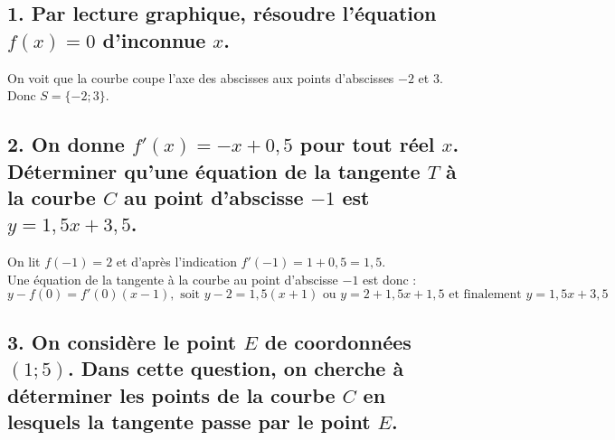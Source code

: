 	
	
	\subsection*{1. Par lecture graphique, résoudre l'équation $f(x) = 0$ d'inconnue $x$.}
	
On voit que la courbe coupe l'axe des abscisses aux points d'abscisses $-2$ et $3$. \\
	Donc $S = \{-2; 3\}$.
	
	\subsection*{2. On donne $f'(x) = -x + 0,5$ pour tout réel $x$. Déterminer qu'une équation de la tangente $T$ à la courbe $C$ au point d'abscisse $-1$ est $y = 1,5x + 3,5$.}
	
On lit $f(-1) = 2$ et d'après l'indication $f'(-1) = 1 + 0,5 = 1,5$.\\
Une équation de la tangente à la courbe au point d'abscisse $-1$ est donc :
	\[
	y - f(0) = f'(0)(x - 1), \text{ soit } y - 2 = 1,5(x + 1) \text{ ou } y = 2 + 1,5x + 1,5 \text{ et finalement } y = 1,5x + 3,5
	\]
	
	\subsection*{3. On considère le point $E$ de coordonnées $(1; 5)$. Dans cette question, on cherche à déterminer les points de la courbe $C$ en lesquels la tangente passe par le point $E$.}
	
